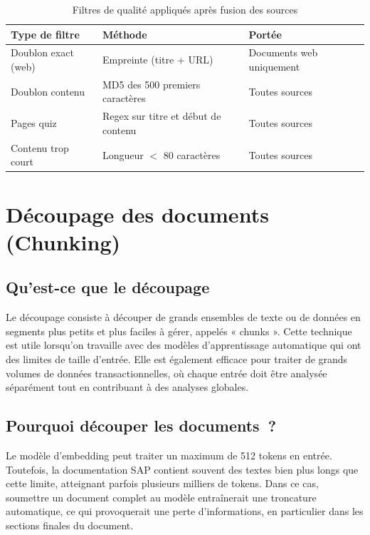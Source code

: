 \begin{table}[H]
\centering
\caption{Filtres de qualité appliqués après fusion des sources}
\label{tab:filtres}
\begin{tabularx}{\textwidth}{|l|X|l|}
\hline
\textbf{Type de filtre} & \textbf{Méthode} & \textbf{Portée} \\
\hline
Doublon exact (web) & Empreinte (titre + URL) & Documents web uniquement \\
\hline
Doublon contenu & MD5 des 500 premiers caractères & Toutes sources \\
\hline
Pages quiz & Regex sur titre et début de contenu & Toutes sources \\
\hline
Contenu trop court & Longueur $<$ 80 caractères & Toutes sources \\
\hline
\end{tabularx}
\end{table}

\section{Découpage des documents (Chunking)}
\label{sec:chunking}
\subsection{Qu’est-ce que le découpage }

Le découpage consiste à découper de grands ensembles de texte ou de données en segments plus petits et plus faciles à gérer, appelés « chunks ». Cette technique est utile lorsqu’on travaille avec des modèles d’apprentissage automatique qui ont des limites de taille d’entrée. Elle est également efficace pour traiter de grands volumes de données transactionnelles, où chaque entrée doit être analysée séparément tout en contribuant à des analyses globales.
\subsection{Pourquoi découper les documents~?}

Le modèle d'embedding peut traiter un maximum de 512 tokens en entrée. Toutefois, la documentation SAP contient souvent des textes bien plus longs que cette limite, atteignant parfois plusieurs milliers de tokens. Dans ce cas, soumettre un document complet au modèle entraînerait une troncature automatique, ce qui provoquerait une perte d'informations, en particulier dans les sections finales du document.

